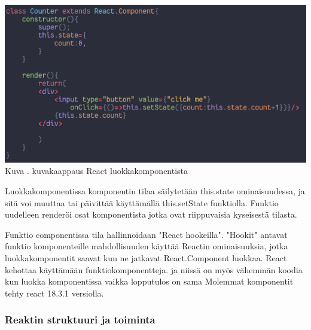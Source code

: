 \includegraphics[width=15cm]{src/public/oppar/class_.png}\\
Kuva \getImgCount{}. kuvakaappaus React luokkakomponentista
\medskip



Luokkakomponentissa komponentin tilaa säilytetään this.state ominaisuudessa, ja sitä voi muuttaa tai päivittää käyttämällä this.setState funktiolla. 
Funktio uudelleen renderöi osat komponentista jotka ovat riippuvaisia kyseisestä tilasta.
\medskip


Funktio componentissa tila hallinnoidaan "React hookeilla"{}. 
"Hookit"{} antavat funktio komponenteille mahdollisuuden käyttää Reactin ominaisuuksia, 
jotka luokkakomponentit saavat kun ne jatkavat React.Component luokkaa.
%
React kehottaa käyttämään funktiokomponentteja. 
ja niissä on myös vähemmän koodia kun luokka komponentissa vaikka lopputulos on sama
Molemmat komponentit tehty react 18.3.1 versiolla.







\medskip

\subsubsection{Reaktin struktuuri ja toiminta}

